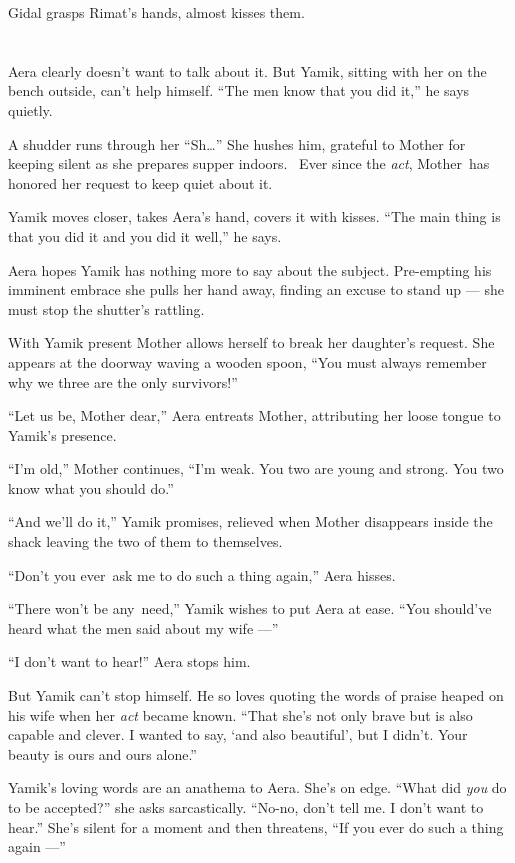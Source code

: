 \documentclass[twoside,11pt]{book}
\begin{document}
Gidal grasps Rimat's hands, almost kisses them.


\bigskip

\chapter{}

Aera clearly doesn't want to talk about it. But Yamik, sitting with her on the bench outside, can't help
himself.  ``The men know that you did it,'' he says quietly.

A shudder runs through her ``Sh{\ldots}''  She hushes him, grateful to Mother for keeping
silent as she prepares supper indoors.~ Ever since the \textit{act}, Mother~has honored her request to keep quiet
about it.

Yamik moves closer, takes Aera's hand, covers it with kisses. ``The main thing is that you did it and you
did it well,'' he says.

Aera hopes Yamik has nothing more to say about the subject. Pre-empting his imminent embrace she pulls her hand away,
finding an excuse to stand up --- she must stop the shutter's rattling.

With Yamik present Mother allows herself to break her daughter's request. She appears at the doorway waving a wooden
spoon, ``You must always remember why we three are the only survivors!''

``Let us be, Mother dear,'' Aera entreats Mother, attributing her loose tongue to Yamik's
presence.

``I'm old,'' Mother continues, ``I'm weak. You two are young and strong. You two
know what you should do.''

``And we'll do it,'' Yamik promises, relieved when Mother disappears inside the shack leaving
the two of them to themselves.

``Don't you ever~ask me to do such a thing again,'' Aera hisses.

``There won't be any~need,'' Yamik wishes to put Aera at ease. ``You should've
heard what the men said about my wife ---''

``I don't want to hear!''  Aera stops him.

But Yamik can't stop himself. He so loves quoting the words of praise heaped on his wife when her \textit{act} became
known. ``That she's not only brave but is also capable and clever. I wanted to say, `and also beautiful',
but I didn't. Your beauty is ours and ours alone.''

Yamik's loving words are an anathema to Aera. She's on edge. ``What did \textit{you} do to be
accepted?'' she asks sarcastically. ``No-no, don't tell me. I don't want to
hear.'' She's silent for a moment and then threatens, ``If you ever do such a thing again
---''
\end{document}
